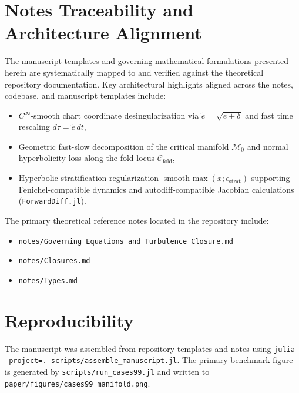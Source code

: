 \documentclass[11pt]{article}
\begin{document}
\section{Notes Traceability and Architecture Alignment}
\label{sec:notes_traceability}

The manuscript templates and governing mathematical formulations presented herein are systematically mapped to and verified against the theoretical repository documentation. Key architectural highlights aligned across the notes, codebase, and manuscript templates include:
\begin{itemize}
    \item $C^\infty$-smooth chart coordinate desingularization via $\tilde{e} = \sqrt{e + \delta}$ and fast time rescaling $d\tau = \tilde{e} \, dt$,
    \item Geometric fast-slow decomposition of the critical manifold $\mathcal{M}_0$ and normal hyperbolicity loss along the fold locus $\mathcal{C}_{\text{fold}}$,
    \item Hyperbolic stratification regularization $\operatorname{smooth\_max}(x; \epsilon_{\text{strat}})$ supporting Fenichel-compatible dynamics and autodiff-compatible Jacobian calculations (\texttt{ForwardDiff.jl}).
\end{itemize}

The primary theoretical reference notes located in the repository include:
\begin{itemize}
    \item \texttt{notes/Governing Equations and Turbulence Closure.md}
    \item \texttt{notes/Closures.md}
    \item \texttt{notes/Types.md}
\end{itemize}

\section{Reproducibility}
The manuscript was assembled from repository templates and notes using
\texttt{julia --project=. scripts/assemble\_manuscript.jl}. The primary benchmark
figure is generated by \texttt{scripts/run\_cases99.jl} and written to
\texttt{paper/figures/cases99\_manifold.png}.

\clearpage

\nocite{*}



\end{document}
